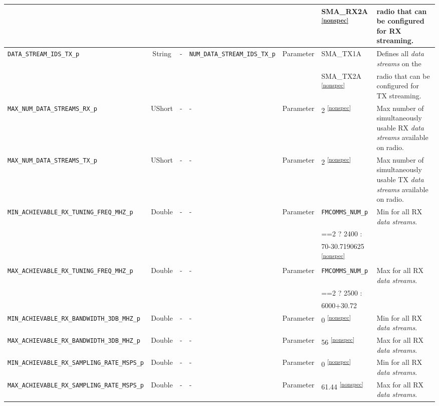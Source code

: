 \documentclass{article}
\begin{document}
\begin{landscape}
\begin{scriptsize}
\begin{longtable}{|p{5.16cm}|c|p{3.5cm}|p{3.4cm}|c|p{2.1cm}|p{3.75cm}|}
			 & & & & & SMA\_RX2A \textsuperscript{\ref{nonspec}} & radio that can be configured for RX streaming.\\
			\hline
			\verb+DATA_STREAM_IDS_TX_p+        & String & -        & \verb+NUM_DATA_STREAM_IDS_TX_p+ & Parameter           & SMA\_TX1A & Defines all \textit{data streams} on the  \\
			 & & & & & SMA\_TX2A \textsuperscript{\ref{nonspec}} & radio that can be configured for TX streaming.\\
			\hline
			\verb+MAX_NUM_DATA_STREAMS_RX_p+        & UShort & -        & -          & Parameter           & 2 \textsuperscript{\ref{nonspec}} & Max number of simultaneously usable RX \textit{data streams} available on radio. \\
			\hline
			\verb+MAX_NUM_DATA_STREAMS_TX_p+        & UShort & -        & -          & Parameter           & 2 \textsuperscript{\ref{nonspec}} & Max number of simultaneously usable TX \textit{data streams} available on radio.  \\
			\hline
			\verb+MIN_ACHIEVABLE_RX_TUNING_FREQ_MHZ_p+        & Double & -        & - & Parameter          & \verb+FMCOMMS_NUM_p+ & Min for all RX \textit{data streams}. \\
			 & & & & & ==2 ? 2400 : & \\
			 & & & & & 70-30.7190625 \textsuperscript{\ref{nonspec}} & \\
			\hline
			\verb+MAX_ACHIEVABLE_RX_TUNING_FREQ_MHZ_p+       & Double & -        & - & Parameter           & \verb+FMCOMMS_NUM_p+ & Max for all RX \textit{data streams}. \\
			 & & & & & ==2 ? 2500 : & \\
			 & & & & & 6000+30.72 & \\
			\hline
			\verb+MIN_ACHIEVABLE_RX_BANDWIDTH_3DB_MHZ_p+      & Double & -        & - & Parameter           & 0 \textsuperscript{\ref{nonspec}} & Min for all RX \textit{data streams}. \\
			\hline
			\verb+MAX_ACHIEVABLE_RX_BANDWIDTH_3DB_MHZ_p+      & Double & -        & - & Parameter           & 56 \textsuperscript{\ref{nonspec}}  & Max for all RX \textit{data streams}. \\
			\hline
			\verb+MIN_ACHIEVABLE_RX_SAMPLING_RATE_MSPS_p+      & Double & -        & - & Parameter           & 0 \textsuperscript{\ref{nonspec}} & Min for all RX \textit{data streams}. \\
			\hline
			\verb+MAX_ACHIEVABLE_RX_SAMPLING_RATE_MSPS_p+      & Double & -        & - & Parameter           & 61.44 \textsuperscript{\ref{nonspec}} & Max for all RX \textit{data streams}. \\

\end{longtable}
\end{scriptsize}
\end{landscape}
\end{document}

